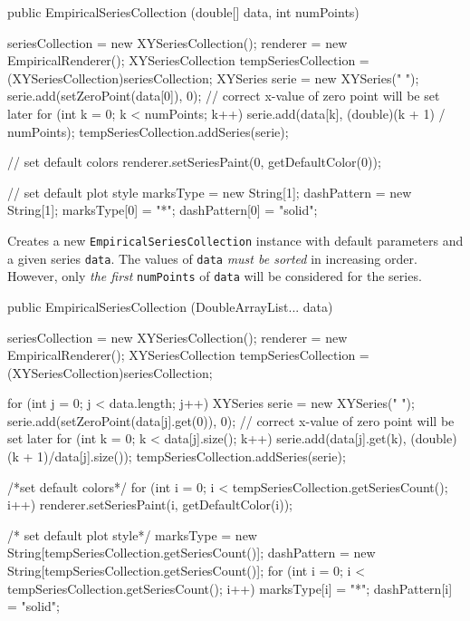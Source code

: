 \begin{code}

   public EmpiricalSeriesCollection (double[] data, int numPoints) \begin{hide} {
      seriesCollection = new XYSeriesCollection();
      renderer = new EmpiricalRenderer();
      XYSeriesCollection tempSeriesCollection = (XYSeriesCollection)seriesCollection;
      XYSeries serie = new XYSeries(" ");
      serie.add(setZeroPoint(data[0]), 0); // correct x-value of zero point will be set later
      for (int k = 0; k < numPoints; k++)
         serie.add(data[k], (double)(k + 1) / numPoints);
      tempSeriesCollection.addSeries(serie);

      // set default colors
      renderer.setSeriesPaint(0, getDefaultColor(0));

      // set default plot style
      marksType = new String[1];
      dashPattern = new String[1];
      marksType[0] = "*";
      dashPattern[0] = "solid";
   }\end{hide}
\end{code}
\begin{tabb}
   Creates a new \texttt{EmpiricalSeriesCollection} instance with default
   parameters and a given series \texttt{data}. The values of \texttt{data}
   \emph{must be sorted} in increasing order.  However, only \emph{the first}
  \texttt{numPoints} of \texttt{data} will be considered for the series.
\end{tabb}
\begin{htmlonly}
\end{htmlonly}
\begin{code}

   public EmpiricalSeriesCollection (DoubleArrayList... data) \begin{hide} {
      seriesCollection = new XYSeriesCollection();
      renderer = new EmpiricalRenderer();
      XYSeriesCollection tempSeriesCollection = (XYSeriesCollection)seriesCollection;

      for (int j = 0; j < data.length; j++) {
         XYSeries serie = new XYSeries(" ");
         serie.add(setZeroPoint(data[j].get(0)), 0); // correct x-value of zero point will be set later
         for (int k = 0; k < data[j].size(); k++)
            serie.add(data[j].get(k), (double)(k + 1)/data[j].size());
         tempSeriesCollection.addSeries(serie);
      }

      /*set default colors*/
      for (int i = 0; i < tempSeriesCollection.getSeriesCount(); i++) {
         renderer.setSeriesPaint(i, getDefaultColor(i));
      }

      /* set default plot style*/
      marksType = new String[tempSeriesCollection.getSeriesCount()];
      dashPattern = new String[tempSeriesCollection.getSeriesCount()];
      for (int i = 0; i < tempSeriesCollection.getSeriesCount(); i++) {
         marksType[i] = "*";
         dashPattern[i] = "solid";
      }
   }\end{hide}
\end{code}
